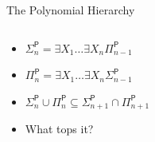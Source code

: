 \documentclass[usenames,dvipsnames]{beamer}
\newcommand{\PTime}{\mathsf{P}}
\begin{document}
\begin{frame}{The Polynomial Hierarchy}
    \begin{columns}
        \begin{column}{0.5\textwidth}
            \begin{itemize}
                \item $\Sigma^\PTime_n = \exists X_1\ldots\exists X_n\Pi^\PTime_{n-1}$
                \item $\Pi^\PTime_n = \exists X_1\ldots\exists X_n\Sigma^\PTime_{n-1}$
                \item $\Sigma^\PTime_n\cup\Pi^\PTime_n\subseteq\Sigma^\PTime_{n+1}\cap\Pi^\PTime_{n+1}$
                \item What tops it? 
            \end{itemize}
        \end{column}
        \begin{column}{0.5\textwidth}
        \end{column}
    \end{columns}
\end{frame}
 
\end{document}
